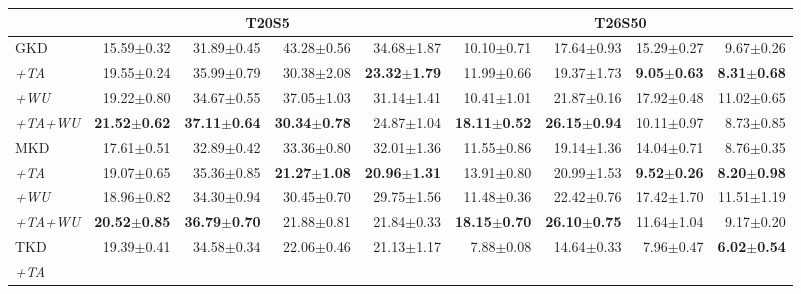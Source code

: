 \begin{appendix}
\begin{table*}[!th]
{\begin{tabular}{@{}lrrrrrrrr@{}}
 &
  \multicolumn{4}{c}{T20S5} &
  \multicolumn{4}{c}{T26S50} \\ 
 \midrule
GKD &
  15.59$\pm$0.32 &
  31.89$\pm$0.45 &
  43.28$\pm$0.56 &
  34.68$\pm$1.87 &
  10.10$\pm$0.71 &
  17.64$\pm$0.93 &
  15.29$\pm$0.27 &
  9.67$\pm$0.26 \\
\textit{+TA} &
  19.55$\pm$0.24 &
  35.99$\pm$0.79 &
  30.38$\pm$2.08 &
  \textbf{23.32$\pm$1.79} &
  11.99$\pm$0.66 &
  19.37$\pm$1.73 &
  \textbf{9.05$\pm$0.63} &
  \textbf{8.31$\pm$0.68} \\
\textit{+WU} &
  19.22$\pm$0.80 &
  34.67$\pm$0.55 &
  37.05$\pm$1.03 &
  31.14$\pm$1.41 &
  10.41$\pm$1.01 &
  21.87$\pm$0.16 &
  17.92$\pm$0.48 &
  11.02$\pm$0.65 \\
\textit{+TA+WU} &
  \textbf{21.52$\pm$0.62} &
  \textbf{37.11$\pm$0.64} &
  \textbf{30.34$\pm$0.78} &
  24.87$\pm$1.04 &
  \textbf{18.11$\pm$0.52} &
  \textbf{26.15$\pm$0.94} &
  10.11$\pm$0.97 &
  8.73$\pm$0.85 \\ \midrule
MKD &
  17.61$\pm$0.51 &
  32.89$\pm$0.42 &
  33.36$\pm$0.80 &
  32.01$\pm$1.36 &
  11.55$\pm$0.86 &
  19.14$\pm$1.36 &
  14.04$\pm$0.71 &
  8.76$\pm$0.35 \\
\textit{+TA} &
  19.07$\pm$0.65 &
  35.36$\pm$0.85 &
  \textbf{21.27$\pm$1.08} &
  \textbf{20.96$\pm$1.31} &
  13.91$\pm$0.80 &
  20.99$\pm$1.53 &
  \textbf{9.52$\pm$0.26} &
  \textbf{8.20$\pm$0.98} \\
\textit{+WU} &
  18.96$\pm$0.82 &
  34.30$\pm$0.94 &
  30.45$\pm$0.70 &
  29.75$\pm$1.56 &
  11.48$\pm$0.36 &
  22.42$\pm$0.76 &
  17.42$\pm$1.70 &
  11.51$\pm$1.19 \\
\textit{+TA+WU} &
  \textbf{20.52$\pm$0.85} &
  \textbf{36.79$\pm$0.70} &
  21.88$\pm$0.81 &
  21.84$\pm$0.33 &
  \textbf{18.15$\pm$0.70} &
  \textbf{26.10$\pm$0.75} &
  11.64$\pm$1.04 &
  9.17$\pm$0.20 \\ \midrule
TKD &
  19.39$\pm$0.41 &
  34.58$\pm$0.34 &
  22.06$\pm$0.46 &
  21.13$\pm$1.17 &
  7.88$\pm$0.08 &
  14.64$\pm$0.33 &
  7.96$\pm$0.47 &
  \textbf{6.02$\pm$0.54} \\
\textit{+TA} &

\end{tabular}}
\end{table*}
\end{appendix}
